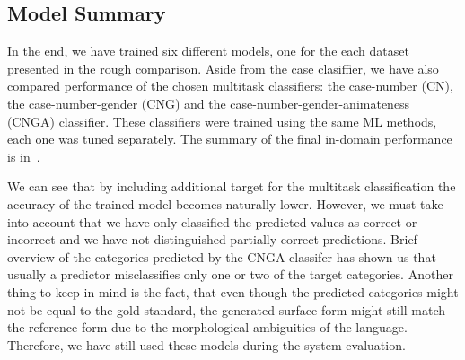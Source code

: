 
\subsection{Model Summary}

In the end, we have trained six different models, one for the each dataset presented in the rough comparison.
Aside from the case clasiffier, we have also compared performance of the chosen multitask classifiers:
the case-number (CN), the case-number-gender (CNG) and the case-number-gender-animateness (CNGA)
classifier. These classifiers were trained using the same ML methods, each one was tuned separately.
The summary of the final in-domain performance is in~.

We can see that by including additional target for the multitask classification the accuracy of the trained
model becomes naturally lower. However, we must take into account that we have only classified the predicted
values as correct or incorrect and we have not distinguished partially correct predictions. Brief overview
of the categories predicted by the CNGA classifer has shown us that usually a predictor misclassifies only
one or two of the target categories. Another thing to keep in mind is the fact, that even though the predicted
categories might not be equal to the gold standard, the generated surface form might still match the reference form
due to the morphological ambiguities of the language. Therefore, we have still used these models during the system evaluation.


